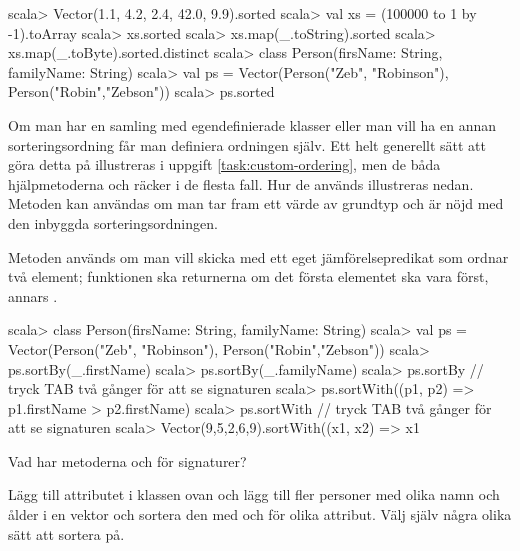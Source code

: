 \begin{REPL}
scala> Vector(1.1, 4.2, 2.4, 42.0, 9.9).sorted
scala> val xs = (100000 to 1 by -1).toArray
scala> xs.sorted
scala> xs.map(_.toString).sorted
scala> xs.map(_.toByte).sorted.distinct
scala> class Person(firsName: String, familyName: String)
scala> val ps = Vector(Person("Zeb", "Robinson"), Person("Robin","Zebson")) 
scala> ps.sorted
\end{REPL}	

\Subtask Om man har en samling med egendefinierade klasser eller man vill ha en annan sorteringsordning får man definiera ordningen själv. Ett helt generellt sätt att göra detta på  illustreras i uppgift \ref{task:custom-ordering}, men de båda hjälpmetoderna  och  räcker i de flesta fall. Hur de används illustreras nedan. Metoden  kan användas om man tar fram ett värde av grundtyp och är nöjd med den inbyggda sorteringsordningen. 

Metoden  används om man vill skicka med ett eget jämförelsepredikat som ordnar två element; funktionen ska returnerna  om det första elementet ska vara först, annars .

\begin{REPL}
scala> class Person(firsName: String, familyName: String)
scala> val ps = Vector(Person("Zeb", "Robinson"), Person("Robin","Zebson")) 
scala> ps.sortBy(_.firstName)
scala> ps.sortBy(_.familyName)
scala> ps.sortBy  // tryck TAB två gånger för att se signaturen
scala> ps.sortWith((p1, p2) => p1.firstName > p2.firstName) 
scala> ps.sortWith  // tryck TAB två gånger för att se signaturen
scala> Vector(9,5,2,6,9).sortWith((x1, x2) => x1 %
\end{REPL}
Vad har metoderna  och  för signaturer? 

\Subtask Lägg till attributet  i klassen  ovan och lägg till fler personer med olika namn och ålder i en vektor och sortera den med  och  för olika attribut. Välj själv några olika sätt att sortera på. 



